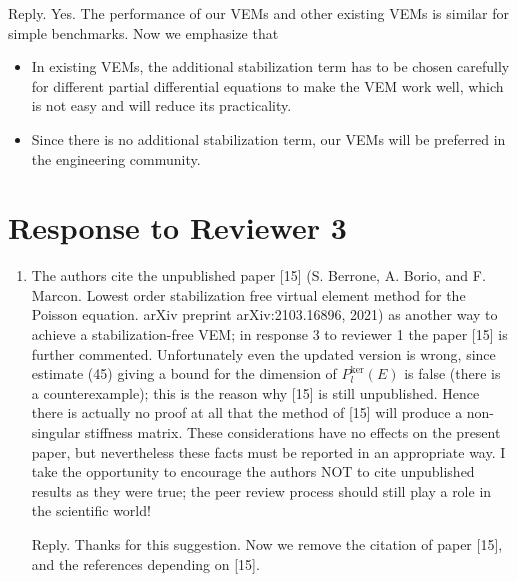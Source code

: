\documentclass[10pt]{amsart}
\theoremstyle{definition}
\theoremstyle{remark}
\begin{document}
\begin{enumerate}[1.]
\smallskip \noindent \textcolor[rgb]{1.00,0.00,0.00}{Reply.}
Yes. The performance of our VEMs and other existing VEMs is similar for simple benchmarks.
Now we emphasize that
\begin{itemize}
\item
In existing VEMs, the additional stabilization term has to be chosen carefully for different partial differential equations to make the VEM work well, which is not easy and will reduce its practicality.
\item 
Since there is no additional stabilization term, our VEMs will be preferred in the engineering community. 
\end{itemize}


\end{enumerate}




\section{Response to Reviewer 3}

\begin{enumerate}[1.]
\item \textsf{The authors cite the unpublished paper [15] (S. Berrone, A. Borio, and F. Marcon. Lowest order stabilization free virtual element method for the Poisson equation. arXiv preprint arXiv:2103.16896, 2021) as another way to achieve a stabilization-free VEM; in response 3 to reviewer 1 the paper [15] is further commented. Unfortunately even the updated version is wrong, since estimate (45) giving a bound for the dimension of $P_l^\text{ker}(E)$ is false (there is a counterexample); this is the reason why [15] is still unpublished. Hence there is actually no proof at all that the method of [15] will produce a non-singular stiffness matrix. These considerations have no effects on the present paper, but nevertheless these facts must be reported in an appropriate way. \vskip0.1cm
\noindent 
I take the opportunity to encourage the authors NOT to cite unpublished results as they were true; the peer review process should still play a role in the scientific world!}

\smallskip \noindent \textcolor[rgb]{1.00,0.00,0.00}{Reply.}
Thanks for this suggestion. Now we remove the citation of paper [15], and the references depending on [15].



\end{enumerate}


% 
% 

\end{document}
